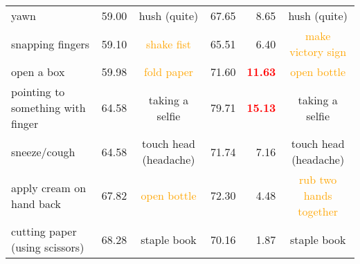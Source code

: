 \documentclass[journal,comsoc]{IEEEtran}
\begin{document}
\begin{table*}[t]
{\begin{tabular}{l|rc|rrc}
yawn & 59.00 & hush (quite)   & 67.65 & 8.65 & hush (quite)   \\
\rowcolor{Gray!30}
snapping fingers & 59.10 & \textcolor{orange}{shake fist}   & 65.51 & 6.40 & \textcolor{orange}{make victory sign}   \\
open a box & 59.98 & \textcolor{orange}{fold paper}   & 71.60 & \textcolor{red}{\textbf{11.63}} & \textcolor{orange}{open bottle}   \\
\rowcolor{Gray!30}
pointing to something with finger & 64.58 & taking a selfie   & 79.71 & \textcolor{red}{\textbf{15.13}} & taking a selfie   \\
sneeze/cough & 64.58 & touch head (headache)   & 71.74 & 7.16 & touch head (headache)   \\
\rowcolor{Gray!30}
apply cream on hand back & 67.82 & \textcolor{orange}{open bottle}   & 72.30 & 4.48 & \textcolor{orange}{rub two hands together}   \\
cutting paper (using scissors) & 68.28 & staple book   & 70.16 & 1.87 & staple book   \\
\bottomrule 
\end{tabular}
}
\label{table:confusion}
\end{table*}
\end{document}
